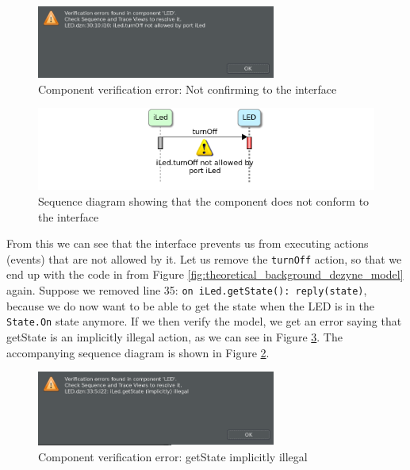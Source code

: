 \documentclass[12pt]{scrreprt}
\begin{document}
\begin{figure}[H]
    \centering
    \includegraphics[width=0.7\textwidth]{Figures/theoretical_background/led_verification_error.png}
    \caption{Component verification error: Not confirming to the interface}
    \label{Component verification error: Not confirming to the interface}
\end{figure}

\begin{figure}[H]
    \centering
    \includegraphics[width=\textwidth]{Figures/theoretical_background/verification_error_in_sequence_diagram.png}
    \caption{Sequence diagram showing that the component does not conform to the interface}
    \label{Sequence diagram showing that the component does not conform to the interface}
\end{figure}

From this we can see that the interface prevents us from executing actions (events) that are not allowed by it. Let us remove the \texttt{turnOff} action, so that we end up with the code in from Figure \ref{fig:theoretical_background_dezyne_model} again. Suppose we removed line 35: \texttt{on iLed.getState(): reply(state)}, because we do now want to be able to get the state when the LED is in the \texttt{State.On} state anymore. If we then verify the model, we get an error saying that getState is an implicitly illegal action, as we can see in Figure \ref{Component verification error: getState implicitly illegal}. The accompanying sequence diagram is shown in Figure \ref{Sequence diagram showing that the component does not conform to the interface}.

\begin{figure}[H]
    \centering
    \includegraphics[width=0.7\textwidth]{Figures/theoretical_background/led_verfication_error_getState.png}
    \caption{Component verification error: getState implicitly illegal}
    \label{Component verification error: getState implicitly illegal}
\end{figure}
\end{document}
